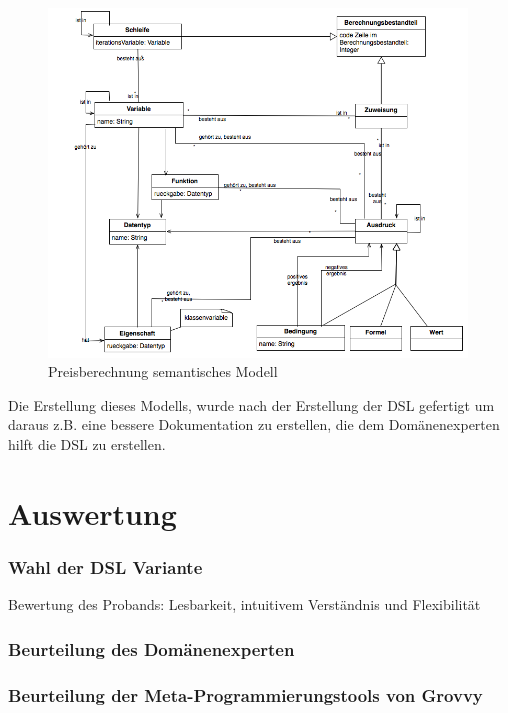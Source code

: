 \documentclass[11pt,english,ngerman, headsepline]{scrreprt}
\begin{document}
\begin{figure}[h!]
	\begin{center}
	\includegraphics[width=0.99\textwidth]{pics/mm}
	\end{center}
	\caption{Preisberechnung semantisches Modell}
	\label{mm.png}
\end{figure}

Die Erstellung dieses Modells, wurde nach der Erstellung der DSL gefertigt um
daraus z.B. eine bessere Dokumentation zu erstellen, die dem Domänenexperten
hilft die DSL zu erstellen.
  
 
\chapter{Auswertung}



\subsection{Wahl der DSL Variante}
Bewertung des Probands: Lesbarkeit, intuitivem Verständnis und Flexibilität

\subsection{Beurteilung des Domänenexperten}

\subsection{Beurteilung der Meta-Programmierungstools von Grovvy}
 
\end{document}
